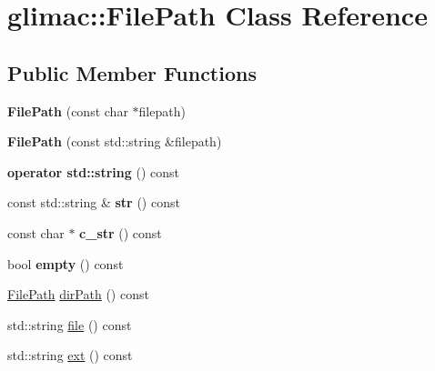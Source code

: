 \hypertarget{classglimac_1_1FilePath}{}\section{glimac\+:\+:File\+Path Class Reference}
\label{classglimac_1_1FilePath}
\subsection*{Public Member Functions}
\begin{DoxyCompactItemize}
\item 
\mbox{\label{classglimac_1_1FilePath_aa049e2800413955e3e02c8ebae66be9f}} 
{\bfseries File\+Path} (const char $\ast$filepath)
\item 
\mbox{\label{classglimac_1_1FilePath_a7add76a049f3232827af4393c734a3ad}} 
{\bfseries File\+Path} (const std\+::string \&filepath)
\item 
\mbox{\label{classglimac_1_1FilePath_adef5c3ff1a59b5ce13b51d2cc6370fd9}} 
{\bfseries operator std\+::string} () const
\item 
\mbox{\label{classglimac_1_1FilePath_a620578376a3387535f94ad16ab4839dd}} 
const std\+::string \& {\bfseries str} () const
\item 
\mbox{\label{classglimac_1_1FilePath_ab2a882fca87897e8eb96ff6fb3b9f3dd}} 
const char $\ast$ {\bfseries c\+\_\+str} () const
\item 
\mbox{\label{classglimac_1_1FilePath_a660dea9e8324aac4962bca25b963ef77}} 
bool {\bfseries empty} () const
\item 
\hyperlink{classglimac_1_1FilePath}{File\+Path} \hyperlink{classglimac_1_1FilePath_a75d8d5573b69d79dd745513ddd4b158f}{dir\+Path} () const
\item 
std\+::string \hyperlink{classglimac_1_1FilePath_af62ce630c3e3a5e106556cdf17773f3a}{file} () const
\item 
std\+::string \hyperlink{classglimac_1_1FilePath_ac36e170d0864ed2c5f1296dac2104b15}{ext} () const
\item 
\mbox{\label{classglimac_1_1FilePath_a2734fcfcdb943df0c3e8b5b0e8285301}} 

\end{DoxyCompactItemize}

